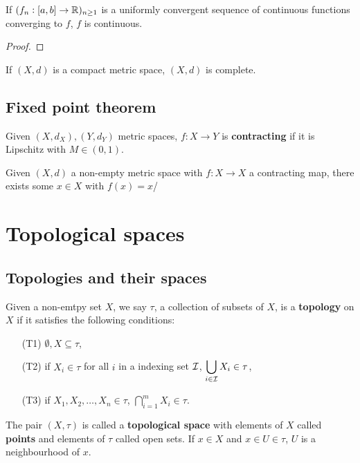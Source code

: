 \documentclass[../Year2.tex]{subfiles}
\begin{document}
\begin{proposition}
    If $(f_n:[a,b]\rightarrow\mathbb{R})_{n\geq1}$ is a uniformly convergent sequence of continuous functions converging to $f$, $f$ is continuous. \begin{proof}
        
    \end{proof}
\end{proposition}

\begin{proposition}
    If $(X,d)$ is a compact metric space, $(X,d)$ is complete.
\end{proposition}

\subsection{Fixed point theorem}

\begin{definition}
    Given $(X,d_X), (Y,d_Y)$ metric spaces, $f:X\rightarrow Y$ is \textbf{contracting} if it is Lipschitz with $M\in(0,1)$. 
\end{definition}

\begin{theorem}
    Given $(X,d)$ a non-empty metric space with $f:X\rightarrow X$ a contracting map, there exists some $x\in X$ with $f(x)=x$/
\end{theorem}

\section{Topological spaces}

\subsection{Topologies and their spaces}

\begin{definition}[Topology]
    Given a non-emtpy set $X$, we say $\tau$, a collection of subsets of $X$, is a \textbf{topology} on $X$ if it satisfies the following conditions: \begin{enumerate}
        \item[(T1)] $\emptyset,X\subseteq\tau$,
        \item[(T2)] if $X_i\in\tau$ for all $i$ in a indexing set $\mathcal{I}$, $\displaystyle \bigcup_{i\in\mathcal{I}}X_i\in\tau$,
        \vspace{-10pt}
        \item[(T3)] if $X_1,X_2,\ldots,X_n\in\tau$, $\displaystyle \bigcap_{i=1}^m X_i\in\tau$.
    \end{enumerate}
    The pair $(X,\tau)$ is called a \textbf{topological space} with elements of $X$ called \textbf{points} and elements of $\tau$ called open sets. If $x\in X$ and $x\in U\in\tau$, $U$ is a neighbourhood of $x$.
\end{definition}
\end{document}
